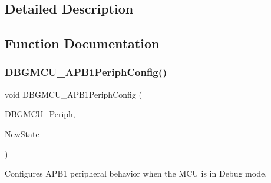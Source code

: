 \subsection{Detailed Description}


\subsection{Function Documentation}
\mbox{\label{group__DBGMCU__Private__Functions_ga71349f1435471f71979c742360df88f0}} 
\subsubsection{D\+B\+G\+M\+C\+U\+\_\+\+A\+P\+B1\+Periph\+Config()}
{\footnotesize\ttfamily void D\+B\+G\+M\+C\+U\+\_\+\+A\+P\+B1\+Periph\+Config (\begin{DoxyParamCaption}\item[{uint32\+\_\+t}]{D\+B\+G\+M\+C\+U\+\_\+\+Periph,  }\item[{\textbf{ Functional\+State}}]{New\+State }\end{DoxyParamCaption})}



Configures A\+P\+B1 peripheral behavior when the M\+CU is in Debug mode. 


